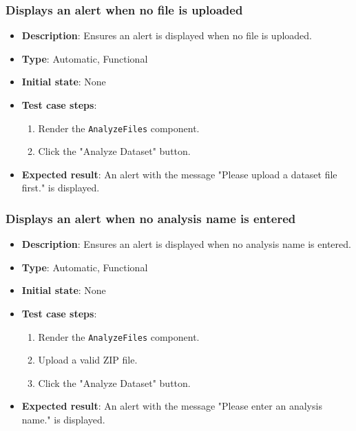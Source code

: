 \documentclass[12pt, titlepage]{article}
\begin{document}
\subsubsection{Displays an alert when no file is uploaded}
\begin{itemize}
    \item \textbf{Description}: Ensures an alert is displayed when no file is uploaded.
    \item \textbf{Type}: Automatic, Functional
    \item \textbf{Initial state}: None
    \item \textbf{Test case steps}:
    \begin{enumerate}
        \item Render the \texttt{AnalyzeFiles} component.
        \item Click the "Analyze Dataset" button.
    \end{enumerate}
    \item \textbf{Expected result}: An alert with the message "Please upload a dataset file first." is displayed.
\end{itemize}

\subsubsection{Displays an alert when no analysis name is entered}
\begin{itemize}
    \item \textbf{Description}: Ensures an alert is displayed when no analysis name is entered.
    \item \textbf{Type}: Automatic, Functional
    \item \textbf{Initial state}: None
    \item \textbf{Test case steps}:
    \begin{enumerate}
        \item Render the \texttt{AnalyzeFiles} component.
        \item Upload a valid ZIP file.
        \item Click the "Analyze Dataset" button.
    \end{enumerate}
    \item \textbf{Expected result}: An alert with the message "Please enter an analysis name." is displayed.
    
\end{itemize}
\end{document}
